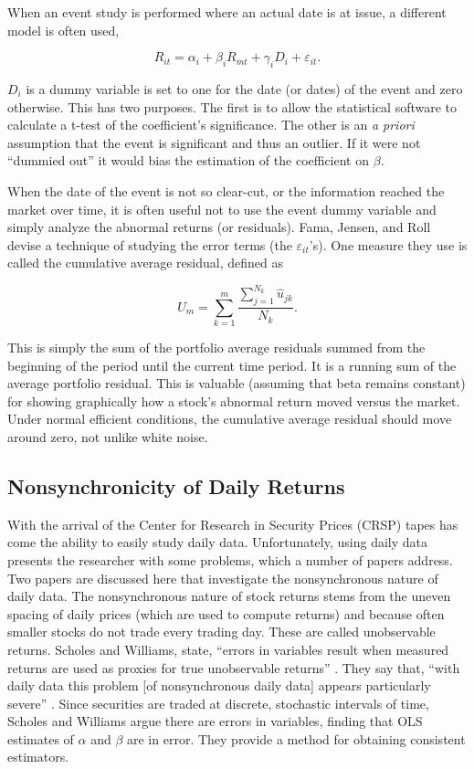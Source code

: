When an event study is performed where an actual date is at issue, a different model is often used,

\begin{equation}
R_{it}=\alpha_i+\beta_i R_{mt}+\gamma_i D_{i} + \varepsilon_{it}.
\end{equation}

$D_{i}$ is a dummy variable is set to one for the date (or dates) of the event and zero otherwise. This has two purposes. The first is to allow the statistical software to calculate a t-test of the coefficient's significance. The other is an {\em a priori} assumption that the event is significant and thus an outlier. If it were not ``dummied out'' it would bias the estimation of the coefficient on $\beta$.

When the date of the event is not so clear-cut, or the information reached the market over time, it is often useful not to use the event dummy variable and simply analyze the abnormal returns (or residuals). Fama, Jensen, and Roll \cite{famaetal69} devise a technique of studying the error terms (the $\varepsilon_{it}$'s). One measure they use is called the cumulative average residual, defined as

\begin{equation}
U_m=\sum_{k=1}^{m}\frac{\sum_{j=1}^{N_k}\hat u_{jk}}{N_{k}}.
\end{equation}

This is simply the sum of the portfolio average residuals summed from the beginning of the period until the current time period. It is a running sum of the average portfolio residual. This is valuable (assuming that beta remains constant) for showing graphically how a stock's abnormal return moved versus the market. Under normal efficient conditions, the cumulative average residual should move around zero, not unlike white noise.

\subsection{Nonsynchronicity of Daily Returns}

With the arrival of the Center for Research in Security Prices (CRSP) tapes has come the ability to easily study daily data. Unfortunately, using daily data presents the researcher with some problems, which a number of papers address. Two papers are discussed here that investigate the nonsynchronous nature of daily data. The nonsynchronous nature of stock returns stems from the uneven spacing of daily prices (which are used to compute returns) and because often smaller stocks do not trade every trading day. These are called unobservable returns. Scholes and Williams, state, ``errors in variables result when measured returns are used as proxies for true unobservable returns'' \cite[p. 311]{scholes77}. They say that, ``with daily data this problem [of nonsynchronous daily data] appears particularly severe'' \cite[p. 309]{scholes77}. Since securities are traded at discrete, stochastic intervals of time, Scholes and Williams argue there are errors in variables, finding that OLS estimates of $\alpha$ and $\beta$ are in error. They provide a method for obtaining consistent estimators.

